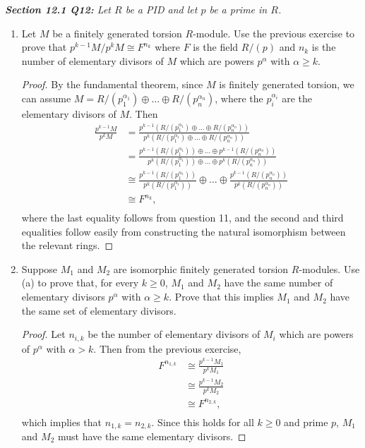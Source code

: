 \documentclass{article}
\begin{document}
\it \textbf{Section 12.1 Q12:} Let $R$ be a PID and let $p$ be a prime in
  $R$.
  \begin{enumerate}[label={(\alph*)}]
    \item Let $M$ be a finitely generated torsion $R$-module. Use the
      previous exercise to prove that $p^{k-1}M/p^kM\cong F^{n_k}$ where
      $F$ is the field $R/(p)$ and $n_k$ is the number of elementary
      divisors of $M$ which are powers $p^\alpha$ with $\alpha\geq k$.

      \begin{proof}
        By the fundamental theorem, since $M$ is finitely generated
        torsion, we can assume $M=R/(p_1^{\alpha_1})
        \oplus\ldots \oplus R/(p_n^{\alpha_n})$, where the $p_i^{\alpha_i}$
        are the elementary divisors of $M$. Then
        \begin{align*}
          \frac{p^{k-1}M}{p^kM} &=\frac{p^{k-1}(R/(p_1^{\alpha_1})
            \oplus\ldots \oplus R/(p_n^{\alpha_n}))}{p^k(R/(p_1^{\alpha_1})
            \oplus\ldots \oplus R/(p_n^{\alpha_n}))}\\
          &=\frac{p^{k-1}(R/(p_1^{\alpha_1}))
            \oplus\ldots \oplus p^{k-1}(R/(p_n^{\alpha_n}))}
            {p^{k}(R/(p_1^{\alpha_1})) \oplus\ldots \oplus
            p^{k}(R/(p_n^{\alpha_n}))}\\
          &\cong\frac{p^{k-1}(R/(p_1^{\alpha_1}))}
            {p^{k}(R/(p_1^{\alpha_1}))} \oplus\ldots
            \oplus\frac{p^{k-1}(R/(p_n^{\alpha_n}))}
            {p^{k}(R/(p_n^{\alpha_n}))}\\
          &\cong F^{n_k},\\
        \end{align*}
        where the last equality follows from question 11, and the second
        and third equalities follow easily from constructing the natural
        isomorphism between the relevant rings.
      \end{proof}

    \item Suppose $M_1$ and $M_2$ are isomorphic finitely generated torsion
      $R$-modules. Use (a) to prove that, for every $k\geq0$, $M_1$ and
      $M_2$ have the same number of elementary divisors $p^\alpha$ with
      $\alpha\geq k$. Prove that this implies $M_1$ and $M_2$ have the same
      set of elementary divisors.

      \begin{proof}
        Let $n_{i,k}$ be the number of elementary divisors of $M_i$ which
        are powers of $p^\alpha$ with $\alpha>k$. Then from the previous
        exercise,
        \begin{align*}
          F^{n_{1,k}} &\cong\frac{p^{k-1}M_1}{p^kM_1}\\
          &\cong\frac{p^{k-1}M_2}{p^kM_2}\\
          &\cong F^{n_{2,k}},\\
        \end{align*}
        which implies that $n_{1,k}=n_{2,k}$. Since this holds for all
        $k\geq0$ and prime $p$, $M_1$ and $M_2$ must have the same
        elementary divisors.
      \end{proof}
  \end{enumerate}
\end{document}

